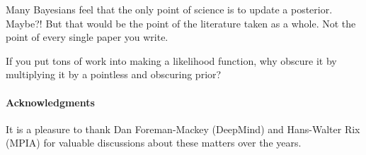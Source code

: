 \documentclass{article}
\begin{document}
Many Bayesians feel that the only point of science is to update a posterior. Maybe?! But that would be the point of the literature taken as a whole. Not the point of every single paper you write.

If you put tons of work into making a likelihood function, why obscure it by multiplying it by a pointless and obscuring prior?

\paragraph{Acknowledgments}
It is a pleasure to thank Dan Foreman-Mackey (DeepMind) and Hans-Walter Rix (MPIA) for valuable discussions about these matters over the years.
\end{document}
